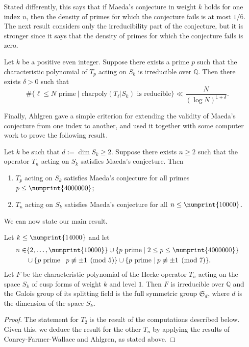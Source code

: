 \documentclass{book}
\newcommand{\QQ}{\mathbb{Q}}
\renewcommand{\SS}{\mathfrak{S}}
\newcommand{\bound}{\numprint{14000}}
\begin{document}
Stated differently, this says that if Maeda's conjecture in weight $k$ holds
for one index $n$, then the density of primes for which the conjecture
fails is at most $1/6$.  The next result considers only the irreducibility
part of the conjecture, but it is stronger since it says that the density of
primes for which the conjecture fails is zero.

\begin{theorem}
  Let $k$ be a positive even integer.  Suppose there exists a prime $p$ such
  that the characteristic polynomial of $T_p$ acting on $S_k$ is irreducible
  over $\QQ$.  Then there exists $\delta>0$ such that
  \begin{equation*}
    \#\{\ell\leq N\text{ prime}\mid \text{charpoly}(T_\ell|S_k)\text{ is reducible}\}
    \ll \frac{N}{(\log N)^{1+\delta}}.
  \end{equation*}
\end{theorem}

Finally, Ahlgren gave a simple criterion for extending the validity of
Maeda's conjecture from one index to another, and used it together with some
computer work to prove the following result.

\begin{theorem}\label{thm:Ahl}
  Let $k$ be such that $d:=\dim S_k\geq 2$.  Suppose there exists $n\geq 2$
  such that the operator $T_n$ acting on $S_k$ satisfies Maeda's conjecture.
  Then
  \begin{enumerate}
    \item $T_p$ acting on $S_k$ satisfies Maeda's conjecture for all primes
      $p\leq\numprint{4000000}$;
    \item $T_n$ acting on $S_k$ satisfies Maeda's conjecture for all
      $n\leq\numprint{10000}$.
  \end{enumerate}
\end{theorem}


We can now state our main result.

\begin{theorem}\label{thm:main}
  Let $k\leq \bound$ and let
  \begin{align*}
    n\in &\{2,\ldots,\numprint{10000}\}\cup
    \{p\text{ prime}\mid 2\leq p\leq\numprint{4000000}\}\\
    &\cup\{p\text{ prime}\mid p\not\equiv\pm 1\pmod{5}\}\cup
    \{p\text{ prime}\mid p\not\equiv\pm 1\pmod{7}\}.
  \end{align*}
  Let $F$ be the characteristic polynomial of the
  Hecke operator $T_n$ acting on the space $S_k$ of cusp forms of weight
  $k$ and level $1$.  Then $F$ is irreducible over $\QQ$ and the Galois
  group of its splitting field is the full symmetric group $\SS_d$, 
  where $d$ is the dimension of the space $S_k$.
\end{theorem}
\begin{proof}
  The statement for $T_2$ is the result of the computations described below.  
  Given this, we deduce the result for the other $T_n$ by applying the results of
  Conrey-Farmer-Wallace and Ahlgren, as stated above.
\end{proof}
\end{document}
